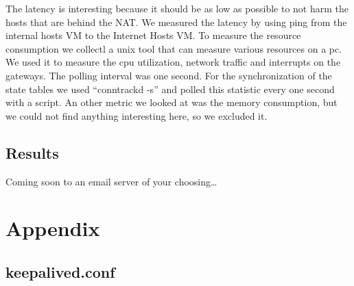 \documentclass{report}
\begin{document}
The latency is interesting because it should be as low as possible to
not harm the hosts that are behind the NAT. We measured the latency by
using ping\cite{ping} from the internal hosts VM to the Internet Hosts VM.
To measure the resource consumption we collectl\cite{collectl} a unix tool that
can measure various resources on a pc. We used it to measure the cpu
utilization, network traffic and interrupts on the gateways. The polling
interval was one second. For the synchronization of the state tables we
used ``conntrackd -s'' and polled this statistic every one second with a
script. An other metric we looked at was the memory consumption, but we
could not find anything interesting here, so we excluded it.

\section{Results}\label{results}

Coming soon to an email server of your choosing\ldots{}

\chapter{Appendix}\label{appendix}

\section{keepalived.conf}\label{keepalived-1}
\end{document}
